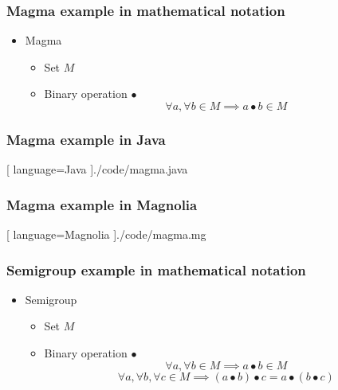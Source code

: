 \begin{frame}
  \frametitle{Magma example in mathematical notation}
  \begin{itemize}
    \item Magma
    \begin{itemize}
      \item Set $M$
      \item Binary operation $\bullet$
      \begin{equation}
        \forall a, \forall b \in M \implies a \bullet b \in M
      \end{equation}
    \end{itemize}
  \end{itemize}
\end{frame}

\begin{frame}
    \frametitle{Magma example in Java}
    \begin{center}
      
      [ language=Java
      ]{./code/magma.java}
    \end{center}
\end{frame}

\begin{frame}
    \frametitle{Magma example in Magnolia}
    \begin{center}
      
      [ language=Magnolia
      ]{./code/magma.mg}
    \end{center}
\end{frame}

\begin{frame}
  \frametitle{Semigroup example in mathematical notation}
  \begin{itemize}
    \item Semigroup
    \begin{itemize}
      \item Set $M$
      \item Binary operation $\bullet$
      \begin{equation}
       \forall a, \forall b \in M \implies a \bullet b \in M
      \end{equation}
      \begin{equation}
        \forall a, \forall b, \forall c \in M \implies
        (a \bullet b) \bullet c = a \bullet (b \bullet c)
      \end{equation}
    \end{itemize}
  \end{itemize}
\end{frame}

